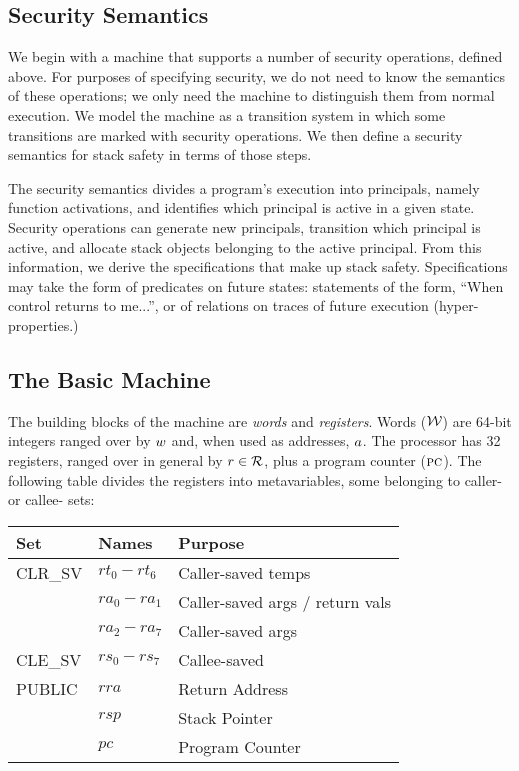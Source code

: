 \documentclass[10pt,conference]{ieeetran}%
\theoremstyle{definition}
\begin{document}
\subsection{Security Semantics}

We begin with a machine that supports a number of security operations,
defined above. For purposes of specifying security, we do not need to
know the semantics of these operations; we only need the machine to
distinguish them from normal execution. We model the machine as
a transition system in which some transitions are marked with
security operations. We then define a security semantics for stack safety
in terms of those steps.

The security semantics divides a program's execution into principals,
namely function activations, and identifies which principal is active
in a given state. Security operations can generate new principals, transition
which principal is active, and allocate stack objects belonging to the active
principal. From this information, we derive the specifications that make up
stack safety. Specifications may take the form of predicates on
future states: statements of the form, ``When control returns to me...'',
or of relations on traces of future execution (hyper-properties.)

\subsection{The Basic Machine}

The building blocks of the machine are {\em words} and {\em registers}.
Words (\({\mathcal W}\)) are 64-bit integers ranged over by \(w\) and, when used as addresses,
\(a\). The processor has 32 registers, ranged over in general by \(r \in {\mathcal R}\),
plus a program counter (\(\textsc{pc}\)). The following table divides
the registers into metavariables, some belonging to caller- or callee- sets:

\vspace{\abovedisplayskip}
\begin{tabular}{| l | l | l |}
  \hline
  Set & Names & Purpose \\
  \hline
  CLR\_SV & \(rt_0 - rt_6\) & Caller-saved temps \\
  & \(ra_0 - ra_1\) & Caller-saved args / return vals \\
  & \(ra_2 - ra_7\) & Caller-saved args \\
  \hline
  CLE\_SV & \(rs_0 - rs_7\) & Callee-saved \\
  \hline
  PUBLIC & \(rra\) & Return Address \\
  & \(rsp\) & Stack Pointer \\
  & \(pc\) & Program Counter \\
  \hline
\end{tabular}
\vspace{\abovedisplayskip}
\end{document}
